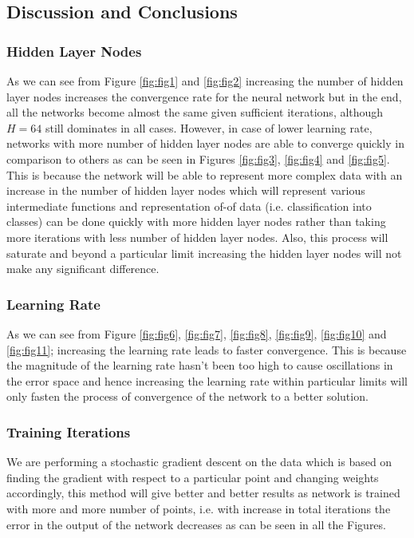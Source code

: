 \documentclass{article}
\begin{document}
\subsection{Discussion and Conclusions}
\subsubsection{Hidden Layer Nodes}
As we can see from Figure \ref{fig:fig1} and \ref{fig:fig2} increasing the number of hidden layer nodes increases the convergence rate for the neural network but in the end, all the networks become almost the same given sufficient iterations, although $H=64$ still dominates in all cases. However, in case of lower learning rate, networks with more number of hidden layer nodes are able to converge quickly in comparison to others as can be seen in Figures \ref{fig:fig3}, \ref{fig:fig4} and \ref{fig:fig5}. This is because the network will be able to represent more complex data with an increase in the number of hidden layer nodes which will represent various intermediate functions and representation of-of data (i.e. classification into classes) can be done quickly with more hidden layer nodes rather than taking more iterations with less number of hidden layer nodes. Also, this process will saturate and beyond a particular limit increasing the hidden layer nodes will not make any significant difference.

\subsubsection{Learning Rate}
As we can see from Figure \ref{fig:fig6}, \ref{fig:fig7}, \ref{fig:fig8}, \ref{fig:fig9}, \ref{fig:fig10} and \ref{fig:fig11}; increasing the learning rate leads to faster convergence. This is because the magnitude of the learning rate hasn't been too high to cause oscillations in the error space and hence increasing the learning rate within particular limits will only fasten the process of convergence of the network to a better solution.

\subsubsection{Training Iterations}
We are performing a stochastic gradient descent on the data which is based on finding the gradient with respect to a particular point and changing weights accordingly, this method will give better and better results as network is trained with more and more number of points, i.e. with increase in total iterations the error in the output of the network decreases as can be seen in all the Figures.
\end{document}
